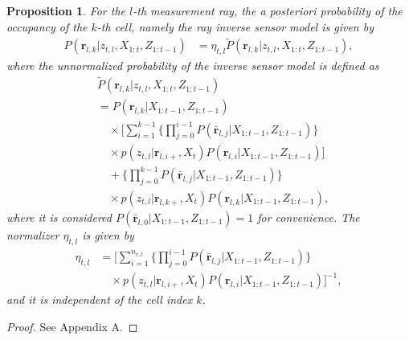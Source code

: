 \documentclass[letterpaper, 10pt, conference]{ieeeconf}
\newtheorem{prop}{Proposition}
\begin{document}
\begin{prop}
For the $l$-th measurement ray, the a posteriori probability of the occupancy of the $k$-th cell, namely the ray inverse sensor model is given by
\begin{align}
\label{eqn:RayISMAnswer}
P(\mathbf{r}_{l,k}|z_{t,l},X_{1:t},Z_{1:t-1})&=\eta_{t,l}\tilde P(\mathbf{r}_{l,k}|z_{t,l},X_{1:t},Z_{1:t-1}),
\end{align}
where the unnormalized probability of the inverse sensor model is defined as
\begin{align}
\label{eqn:Unnormalized}
& \tilde P(\mathbf{r}_{l,k}|z_{t,l},X_{1:t},Z_{1:t-1})\nonumber\\
&=P(\mathbf{r}_{l,k}|X_{1:t-1},Z_{1:t-1})\nonumber\\
&\quad\times 
\bigg[\sum_{i=1}^{k-1}\bigg\{\prod_{j=0}^{i-1}P(\bar{\mathbf{r}}_{l,j}|X_{1:t-1},Z_{1:t-1})\bigg\}\nonumber\\
&\quad\times p(z_{t,l}|\mathbf{r}_{l,i+},X_t)P(\mathbf{r}_{l,i}|X_{1:t-1},Z_{1:t-1})\bigg]\nonumber\\
&\quad + \bigg\{\prod_{j=0}^{k-1}P(\bar{\mathbf{r}}_{l,j}|X_{1:t-1},Z_{1:t-1})\bigg\}\nonumber\\
&\quad\times p(z_{t,l}|\mathbf{r}_{l,k+},X_t)P(\mathbf{r}_{l,k}|X_{1:t-1},Z_{1:t-1}),
\end{align}
where it is considered $P(\bar{\mathbf{r}}_{l,0}|X_{1:t-1},Z_{1:t-1})=1$ for convenience. The normalizer $\eta_{t,l}$ is given by
\begin{align}
\label{eqn:allEta}
\eta_{t,l}
&=
\bigg[\sum_{i=1}^{n_{r,l}}\bigg\{\prod_{j=0}^{i-1}P(\bar{\mathbf{r}}_{l,j}|X_{1:t-1},Z_{1:t-1})\bigg\}\nonumber\\&\quad\times p(z_{t,l}|\mathbf{r}_{l,i+},X_t)P(\mathbf{r}_{l,i}|X_{1:t-1},Z_{1:t-1})\bigg]^{-1},
\end{align}
and it is independent of the cell index $k$.
\end{prop}
\begin{proof}
See Appendix A.
\end{proof}
\end{document}
